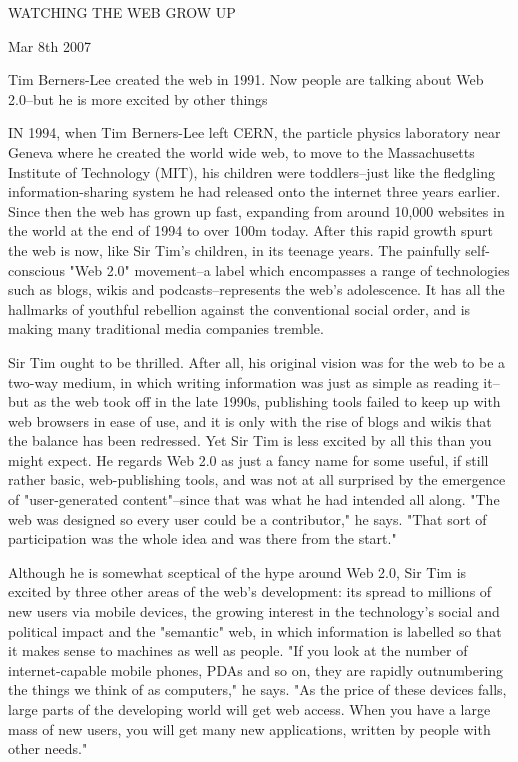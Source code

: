 WATCHING THE WEB GROW UP

Mar 8th 2007  

Tim Berners-Lee created the web in 1991. Now people are talking about Web 2.0--but he is more excited by other things

IN 1994, when Tim Berners-Lee left CERN, the particle physics laboratory near Geneva where he created the world wide web, to move to the Massachusetts Institute of Technology (MIT), his children were toddlers--just like the fledgling information-sharing system he had released onto the internet three years earlier. Since then the web has grown up fast, expanding from around 10,000 websites in the world at the end of 1994 to over 100m today. After this rapid growth spurt the web is now, like Sir Tim's children, in its teenage years. The painfully self-conscious "Web 2.0" movement--a label which encompasses a range of technologies such as blogs, wikis and podcasts--represents the web's adolescence. It has all the hallmarks of youthful rebellion against the conventional social order, and is making many traditional media companies tremble.

Sir Tim ought to be thrilled. After all, his original vision was for the web to be a two-way medium, in which writing information was just as simple as reading it--but as the web took off in the late 1990s, publishing tools failed to keep up with web browsers in ease of use, and it is only with the rise of blogs and wikis that the balance has been redressed. Yet Sir Tim is less excited by all this than you might expect. He regards Web 2.0 as just a fancy name for some useful, if still rather basic, web-publishing tools, and was not at all surprised by the emergence of "user-generated content"--since that was what he had intended all along. "The web was designed so every user could be a contributor," he says. "That sort of participation was the whole idea and was there from the start."

Although he is somewhat sceptical of the hype around Web 2.0, Sir Tim is excited by three other areas of the web's development: its spread to millions of new users via mobile devices, the growing interest in the technology's social and political impact and the "semantic" web, in which information is labelled so that it makes sense to machines as
well as people. "If you look at the number of internet-capable mobile phones, PDAs and so on, they are rapidly outnumbering the things we think of as computers," he says. "As the price of these devices falls, large parts of the developing world will get web access. When you have a large mass of new users, you will get many new applications, written by people with other needs."

